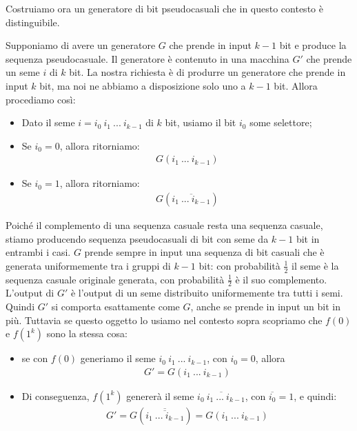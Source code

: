 \begin{enumerate}
    Costruiamo ora un generatore di bit pseudocasuali che in questo contesto è distinguibile. 

    Supponiamo di avere un generatore $G$ che prende in input $k-1$ bit e produce la sequenza pseudocasuale. Il generatore è contenuto in una macchina $G'$ che prende un seme $i$ di $k$ bit. La nostra richiesta è di produrre un generatore che prende in input $k$ bit, ma noi ne abbiamo a disposizione solo uno a $k-1$ bit. Allora procediamo così:
    \begin{itemize}
        \item Dato il seme $i = i_0 \ i_1 \ ... \ i_{k-1}$ di $k$ bit, usiamo il bit $i_0$ some selettore;
        \item Se $i_0 = 0$, allora ritorniamo:
        \begin{align*}
            G(i_1 \ ... \ i_{k-1})
        \end{align*}
        \item Se $i_0 = 1$, allora ritorniamo:
        \begin{align*}
            G(\overline{i_1 \ ... \ i_{k-1}})
        \end{align*}
    \end{itemize}
    Poiché il complemento di una sequenza casuale resta una sequenza casuale, stiamo producendo sequenza pseudocasuali di bit con seme da $k-1$ bit in entrambi i casi. $G$ prende sempre in input una sequenza di bit casuali che è generata uniformemente tra i gruppi di $k-1$ bit: con probabilità $\frac{1}{2}$ il seme è la sequenza casuale originale generata, con probabilità $\frac{1}{2}$ è il suo complemento. L'output di $G'$ è l'output di un seme distribuito uniformemente tra tutti i semi. Quindi $G'$ si comporta esattamente come $G$, anche se prende in input un bit in più. 
    Tuttavia se questo oggetto lo usiamo nel contesto sopra scopriamo che $f(0)$ e $f(1^k)$ sono la stessa cosa: 
    \begin{itemize}
        \item se con $f(0)$ generiamo il seme $i_0 \ i_1 \ ... \ i_{k-1}$, con $i_0 = 0$, allora
        \begin{align*}
            G' = G(i_1 \ ... \ i_{k-1})
        \end{align*}
        \item Di conseguenza, $f(1^k)$ genererà il seme $\overline{i_0 \ i_1 \ ... \ i_{k-1}}$, con $\overline{i_0} = 1$, e quindi:
        \begin{align*}
            G' = G(\overline{\overline{i_1 \ ... \ i_{k-1}}}) = G(i_1 \ ... \ i_{k-1})
        \end{align*}
    \end{itemize}
    

\end{enumerate}
